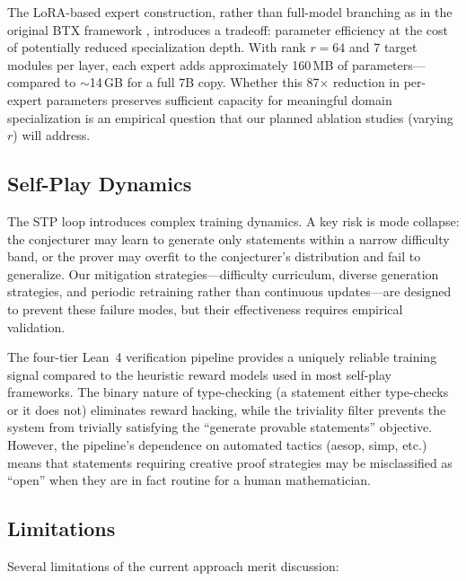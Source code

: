 \documentclass[11pt,a4paper]{article}
\begin{document}
The LoRA-based expert construction, rather than full-model branching as in the original BTX framework \citep{sukhbaatar2024branch}, introduces a tradeoff: parameter efficiency at the cost of potentially reduced specialization depth. With rank $r{=}64$ and 7 target modules per layer, each expert adds approximately 160\,MB of parameters---compared to ${\sim}$14\,GB for a full 7B copy. Whether this 87$\times$ reduction in per-expert parameters preserves sufficient capacity for meaningful domain specialization is an empirical question that our planned ablation studies (varying $r$) will address.

\subsection{Self-Play Dynamics}

The STP loop introduces complex training dynamics. A key risk is mode collapse: the conjecturer may learn to generate only statements within a narrow difficulty band, or the prover may overfit to the conjecturer's distribution and fail to generalize. Our mitigation strategies---difficulty curriculum, diverse generation strategies, and periodic retraining rather than continuous updates---are designed to prevent these failure modes, but their effectiveness requires empirical validation.

The four-tier Lean~4 verification pipeline provides a uniquely reliable training signal compared to the heuristic reward models used in most self-play frameworks. The binary nature of type-checking (a statement either type-checks or it does not) eliminates reward hacking, while the triviality filter prevents the system from trivially satisfying the ``generate provable statements'' objective. However, the pipeline's dependence on automated tactics (aesop, simp, etc.) means that statements requiring creative proof strategies may be misclassified as ``open'' when they are in fact routine for a human mathematician.

\subsection{Limitations}

Several limitations of the current approach merit discussion:
\end{document}

